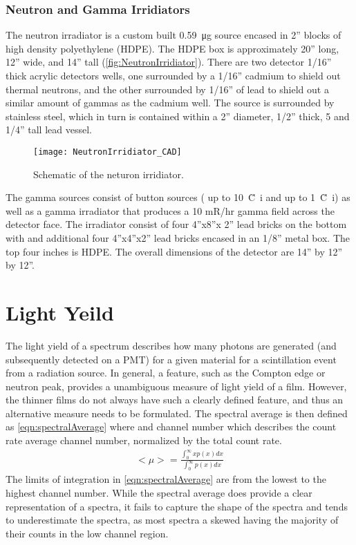 \subsubsection{Neutron and Gamma Irridiators}
The neutron irradiator is a custom built \SI{0.59}{\ug}  source encased in 2” blocks of high density polyethylene (HDPE). 
The HDPE box is approximately 20” long, 12” wide, and 14” tall (\autoref{fig:NeutronIrridiator}). 
There are two detector 1/16” thick acrylic detectors wells, one surrounded by a 1/16” cadmium to shield out thermal neutrons, and the other surrounded by 1/16” of lead to shield out a similar amount of gammas as the cadmium well.
The  source is surrounded by stainless steel, which in turn is contained within a 2” diameter, 1/2” thick, 5 and 1/4” tall lead vessel.
\begin{figure}
  \centering
  \texttt{[image: NeutronIrridiator\_CAD]}
  \caption[CAD Rendering of Neutron Irridiator]{Schematic of the neturon irridiator.}
  \label{fig:NeutronIrridiator}
\end{figure}
The gamma sources consist of button sources ( up to \SI{10}{\u Ci} and  up to \SI{1}{\u Ci}) as well as a gamma irradiator that produces a 10 mR/hr gamma field across the detector face. 
The irradiator consist of four 4”x8”x 2” lead bricks on the bottom with and additional four 4”x4”x2” lead bricks encased in an 1/8” metal box. 
The top four inches is HDPE. 
The overall dimensions of the detector are 14” by 12” by 12”. 

\section{Light Yeild}
The light yield of a spectrum describes how many photons are generated (and subsequently detected on a PMT) for a given material for a scintillation event from a radiation source.
In general, a feature, such as the Compton edge or neutron peak,  provides a unambiguous measure of light yield of a film. 
However, the thinner films do not always have such a clearly defined feature, and thus an alternative measure needs to be formulated.
The spectral average is then defined as \eqref{eqn:spectralAverage} where  and  {channel number} which describes the count rate average channel number, normalized by the total count rate.
\begin{align}
	<\mu> = \frac{\int_0^\infty x p(x) dx}{\int_0^\infty p(x) dx}
	\label{eqn:spectralAverage}
\end{align}
The limits of integration in \eqref{eqn:spectralAverage} are from the lowest to the highest channel number.
While the spectral average does provide a clear representation of a spectra, it fails to capture the shape of the spectra and tends to underestimate the spectra, as most spectra a skewed having the majority of their counts in the low channel region.


